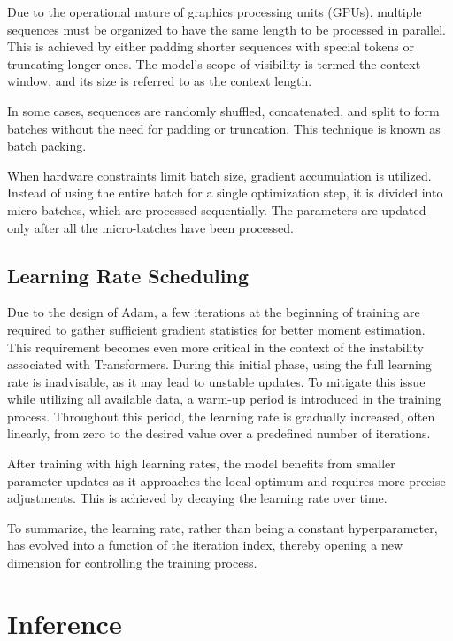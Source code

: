 Due to the operational nature of graphics processing units (GPUs), multiple sequences must be organized to have the same length to be processed in parallel. This is achieved by either padding shorter sequences with special tokens or truncating longer ones. The model's scope of visibility is termed the context window, and its size is referred to as the context length.

In some cases, sequences are randomly shuffled, concatenated, and split to form batches without the need for padding or truncation. This technique is known as batch packing.

When hardware constraints limit batch size, gradient accumulation is utilized. Instead of using the entire batch for a single optimization step, it is divided into micro-batches, which are processed sequentially. The parameters are updated only after all the micro-batches have been processed.

\subsection{Learning Rate Scheduling}

Due to the design of Adam, a few iterations at the beginning of training are required to gather sufficient gradient statistics for better moment estimation. This requirement becomes even more critical in the context of the instability associated with Transformers. During this initial phase, using the full learning rate is inadvisable, as it may lead to unstable updates. To mitigate this issue while utilizing all available data, a warm-up period is introduced in the training process. Throughout this period, the learning rate is gradually increased, often linearly, from zero to the desired value over a predefined number of iterations.

After training with high learning rates, the model benefits from smaller parameter updates as it approaches the local optimum and requires more precise adjustments. This is achieved by decaying the learning rate over time.

To summarize, the learning rate, rather than being a constant hyperparameter, has evolved into a function of the iteration index, thereby opening a new dimension for controlling the training process.

\section{Inference}\label{sec:inference}


